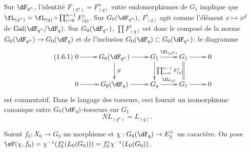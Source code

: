 Sur $\dF_{q^n}$, l'identit\'e $F_{(q^n)}=F_{(q)}^n$ entre endomorphismes de 
$G_1$ implique que $\fL_{(q^n)}=\fL_{(q)}\circ \prod_{i=0}^{n-1} F_{(q)}^i$. 
Sur $G_0(\dF_{q^n})$, $F_{(q)}^i$ agit comme l'\'el\'ement 
$x\mapsto x^{q^i}$ de $\gal(\dF_{q^n}/\dF_q)$. Sur $G_0(\dF_{q^n})$, 
$\prod F_{(q)}^i$ est donc le compos\'e de la norme 
$G_0(\dF_{q^n})\to G_0(\dF_q)$ et de l'inclusion 
$G_0(\dF_q)\subset G_0(\dF_{q^n})$: le diagramme 
\begin{equation*}\tag{1.6.1}\label{VI:eq:1-6-1}
\xymatrix{
  0 \ar[r] 
    & G_0(\dF_{q^n}) \ar[r] \ar[d]^-N 
    & G_1 \ar[r]^-{\fL_{(q^n)}} \ar[d]^-{\prod_{i=0}^{n-1} F_{(q)}^i} 
    & G_1 \ar[r] \ar@{=}[d] 
    & 0 \\
  0 \ar[r] 
    & G_0(\dF_q) \ar[r] 
    & G_q \ar[r]^-{\fL_{(q)}} 
    & G_1 \ar[r] 
    & 0
}
\end{equation*}
est commutatif. Dans le langage des torseurs, ceci fournit un isomorphisme 
canonique entre $G_0(\dF_q)$-torseurs sur $G_1$ 
\begin{equation*}\tag{1.6.2}\label{VI:eq:1-6-2}
  N L_{(q^n)} = L_{(q)} \text{.}
\end{equation*}





\begin{definition_}\label{VI:1-7}
Soient $f_0:X_0\to G_0$ un morphisme et 
$\chi:G_0(\dF_q)\to E_\lambda^\times$ un caract\`ere. On pose 
$\sF(\chi,f_0) = \chi^{-1}(f_0^\ast (L_0(G_0))) = f_0^\ast\chi^{-1}(L_0(G_0))$. 
\end{definition_}

